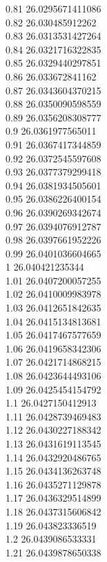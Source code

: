 {0.81	26.0295671411086\\
0.82	26.030485912262\\
0.83	26.0313531427264\\
0.84	26.0321716322835\\
0.85	26.0329440297851\\
0.86	26.033672841162\\
0.87	26.0343604370215\\
0.88	26.0350090598559\\
0.89	26.0356208308777\\
0.9	26.0361977565011\\
0.91	26.0367417344859\\
0.92	26.0372545597608\\
0.93	26.0377379299418\\
0.94	26.0381934505601\\
0.95	26.0386226400154\\
0.96	26.0390269342674\\
0.97	26.0394076912787\\
0.98	26.0397661952226\\
0.99	26.0401036604665\\
1	26.040421235344\\
1.01	26.0407200057255\\
1.02	26.0410009983978\\
1.03	26.0412651842635\\
1.04	26.0415134813681\\
1.05	26.0417467577659\\
1.06	26.0419658342306\\
1.07	26.0421714868215\\
1.08	26.0423644493106\\
1.09	26.0425454154792\\
1.1	26.0427150412913\\
1.11	26.0428739469483\\
1.12	26.0430227188342\\
1.13	26.0431619113545\\
1.14	26.0432920486765\\
1.15	26.0434136263748\\
1.16	26.0435271129878\\
1.17	26.0436329514899\\
1.18	26.0437315606842\\
1.19	26.043823336519\\
1.2	26.0439086533331\\
1.21	26.0439878650338\\
}
